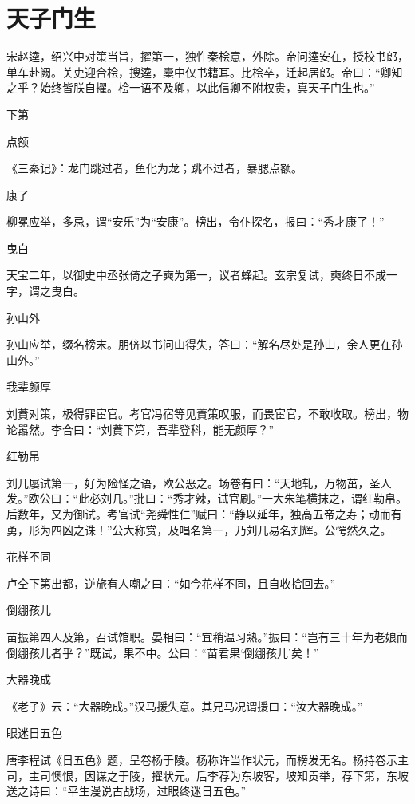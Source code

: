 \documentclass[a4paper,12pt,UTF8,twoside]{ctexbook}
\begin{document}
    \section{天子门生}
    
    宋赵逵，绍兴中对策当旨，擢第一，独忤秦桧意，外除。帝问逵安在，授校书郎，单车赴阙。关吏迎合桧，搜逵，橐中仅书籍耳。比桧卒，迁起居郎。帝曰：“卿知之乎？始终皆朕自擢。桧一语不及卿，以此信卿不附权贵，真天子门生也。”
    
    下第
    
    点额
    
    《三秦记》：龙门跳过者，鱼化为龙；跳不过者，暴腮点额。
    
    康了
    
    柳冕应举，多忌，谓“安乐”为“安康”。榜出，令仆探名，报曰：“秀才康了！”
    
    曳白
    
    天宝二年，以御史中丞张倚之子奭为第一，议者蜂起。玄宗复试，奭终日不成一字，谓之曳白。
    
    孙山外
    
    孙山应举，缀名榜末。朋侪以书问山得失，答曰：“解名尽处是孙山，余人更在孙山外。”
    
    我辈颜厚
    
    刘蕡对策，极得罪宦官。考官冯宿等见蕡策叹服，而畏宦官，不敢收取。榜出，物论嚣然。李合曰：“刘蕡下第，吾辈登科，能无颜厚？”
    
    红勒帛
    
    刘几屡试第一，好为险怪之语，欧公恶之。场卷有曰：“天地轧，万物茁，圣人发。”欧公曰：“此必刘几。”批曰：“秀才辣，试官刷。”一大朱笔横抹之，谓红勒帛。后数年，又为御试。考官试“尧舜性仁”赋曰：“静以延年，独高五帝之寿；动而有勇，形为四凶之诛！”公大称赏，及唱名第一，乃刘几易名刘辉。公愕然久之。
    
    花样不同
    
    卢仝下第出都，逆旅有人嘲之曰：“如今花样不同，且自收拾回去。”
    
    倒绷孩儿
    
    苗振第四人及第，召试馆职。晏相曰：“宜稍温习熟。”振曰：“岂有三十年为老娘而倒绷孩儿者乎？”既试，果不中。公曰：“苗君果‘倒绷孩儿’矣！”
    
    大器晚成
    
    《老子》云：“大器晚成。”汉马援失意。其兄马况谓援曰：“汝大器晚成。”
    
    眼迷日五色
    
    唐李程试《日五色》题，呈卷杨于陵。杨称许当作状元，而榜发无名。杨持卷示主司，主司懊恨，因谋之于陵，擢状元。后李荐为东坡客，坡知贡举，荐下第，东坡送之诗曰：“平生漫说古战场，过眼终迷日五色。”
    
\end{document}
